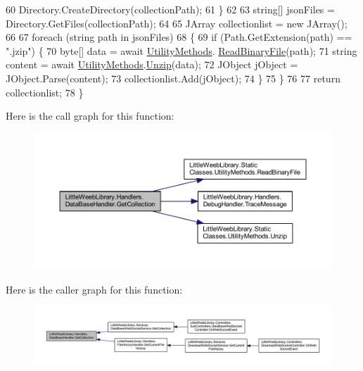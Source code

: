 \begin{DoxyCode}
60                 Directory.CreateDirectory(collectionPath);          
61             \}
62 
63             \textcolor{keywordtype}{string}[] jsonFiles = Directory.GetFiles(collectionPath);
64 
65             JArray collectionlist = \textcolor{keyword}{new} JArray();
66 
67             \textcolor{keywordflow}{foreach} (\textcolor{keywordtype}{string} path \textcolor{keywordflow}{in} jsonFiles)
68             \{
69                 \textcolor{keywordflow}{if} (Path.GetExtension(path) == \textcolor{stringliteral}{".jzip"}) \{
70                     byte[] data = await \mbox{\hyperlink{class_little_weeb_library_1_1_static_classes_1_1_utility_methods}{UtilityMethods}}.
      \mbox{\hyperlink{class_little_weeb_library_1_1_static_classes_1_1_utility_methods_a7b5de7a3ecc749b655fc3ed2af55360b}{ReadBinaryFile}}(path);
71                     \textcolor{keywordtype}{string} content = await \mbox{\hyperlink{class_little_weeb_library_1_1_static_classes_1_1_utility_methods}{UtilityMethods}}.\mbox{\hyperlink{class_little_weeb_library_1_1_static_classes_1_1_utility_methods_a0a86ee01a3bf201bd9cc9b2552e54976}{Unzip}}(data);
72                     JObject jObject = JObject.Parse(content);
73                     collectionlist.Add(jObject);
74                 \}
75             \}
76 
77             \textcolor{keywordflow}{return} collectionlist;            
78         \}
\end{DoxyCode}
Here is the call graph for this function\+:\nopagebreak
\begin{figure}[H]
\begin{center}
\leavevmode
\includegraphics[width=350pt]{class_little_weeb_library_1_1_handlers_1_1_data_base_handler_ae04312874502a18b241c1123ef963b90_cgraph}
\end{center}
\end{figure}
Here is the caller graph for this function\+:\nopagebreak
\begin{figure}[H]
\begin{center}
\leavevmode
\includegraphics[width=350pt]{class_little_weeb_library_1_1_handlers_1_1_data_base_handler_ae04312874502a18b241c1123ef963b90_icgraph}
\end{center}
\end{figure}
